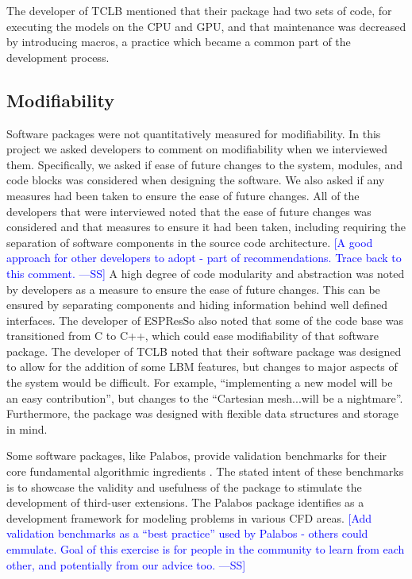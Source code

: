 \documentclass[final, 3p, times, authoryear]{elsarticle}
\newcommand{\authornote}[3]{\textcolor{#1}{[#3 ---#2]}}
\newcommand{\authornote}[3]{}
\newcommand{\wss}[1]{\authornote{blue}{SS}{#1}} %
\begin{document}
The developer of TCLB mentioned that their package had two sets of code, for
executing the models on the CPU and GPU, and that maintenance was decreased by
introducing macros, a practice which became a common part of the development
process. 

\subsection{Modifiability}

Software packages were not quantitatively measured for modifiability. In this
project we asked developers to comment on modifiability when we interviewed
them. Specifically, we asked if ease of future changes to the system, modules,
and code blocks was considered when designing the software. We also asked if any
measures had been taken to ensure the ease of future changes. All of the
developers that were interviewed noted that the ease of future changes was
considered and that measures to ensure it had been taken, including requiring
the separation of software components in the source code architecture.  \wss{A
good approach for other developers to adopt - part of recommendations.  Trace
back to this comment.}  A high degree of code modularity and abstraction was
noted by developers as a measure to ensure the ease of future changes. This can
be ensured by separating components and hiding information behind well defined
interfaces. The developer of ESPResSo also noted that some of the code base was
transitioned from C to C++, which could ease modifiability of that software
package. The developer of TCLB noted that their software package was designed to
allow for the addition of some LBM features, but changes to major aspects of the
system would be difficult. For example, ``implementing a new model will be an
easy contribution'', but changes to the ``Cartesian mesh...will be a
nightmare''. Furthermore, the package was designed with flexible data structures
and storage in mind. 

Some software packages, like Palabos, provide validation benchmarks for their
core fundamental algorithmic ingredients \citep{latt2021palabos}. The stated
intent of these benchmarks is to showcase the validity and usefulness of the
package to stimulate the development of third-user extensions. The Palabos
package identifies as a development framework for modeling problems in various
CFD areas.  \wss{Add validation benchmarks as a ``best practice'' used by
Palabos - others could emmulate.  Goal of this exercise is for people in the
community to learn from each other, and potentially from our advice too.}
\end{document}
